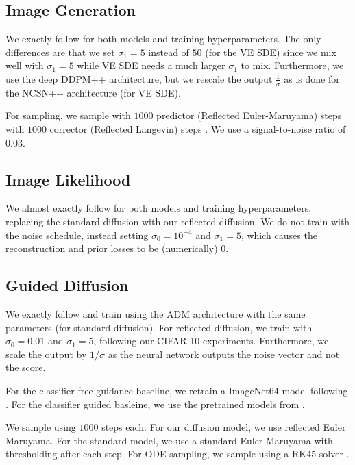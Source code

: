 \documentclass{article}
\theoremstyle{plain}
\theoremstyle{definition}
\theoremstyle{remark}
\begin{document}
\subsection{Image Generation}\label{sec:app:experiment:imgqual}

We exactly follow \citet{Song2020ScoreBasedGM} for both models and training hyperparameters. The only differences are that we set $\sigma_1 = 5$ instead of $50$ (for the VE SDE) since we mix well with $\sigma_1 = 5$ while VE SDE needs a much larger $\sigma_1$ to mix. Furthermore, we use the deep DDPM++ architecture, but we rescale the output $\frac{1}{\sigma}$ as is done for the NCSN++ architecture (for VE SDE).

For sampling, we sample with $1000$ predictor (Reflected Euler-Maruyama) steps with $1000$ corrector (Reflected Langevin) steps \citep{Song2020ScoreBasedGM}. We use a signal-to-noise ratio of $0.03$.

\subsection{Image Likelihood}\label{sec:app:experiment:imglike}

We almost exactly follow \citet{Kingma2021VariationalDM} for both models and training hyperparameters, replacing the standard diffusion with our reflected diffusion. We do not train with the noise schedule, instead setting $\sigma_0 = 10^{-4}$ and $\sigma_1 = 5$, which causes the reconstruction and prior losses to be (numerically) $0$.

\subsection{Guided Diffusion}\label{sec:app:experiment:guided}

We exactly follow \citet{Ho2022ClassifierFreeDG} and train using the ADM architecture \citep{Dhariwal2021DiffusionMB} with the same parameters (for standard diffusion). For reflected diffusion, we train with $\sigma_0 = 0.01$ and $\sigma_1 = 5$, following our CIFAR-10 experiments. Furthermore, we scale the output by $1/\sigma$ as the neural network outputs the noise vector and not the score.

For the classifier-free guidance baseline, we retrain a ImageNet64 model following \citet{Ho2022ClassifierFreeDG}. For the classifier guided basleine, we use the pretrained models from \citet{Dhariwal2021DiffusionMB}.

We sample using $1000$ steps each. For our diffusion model, we use reflected Euler Maruyama. For the standard model, we use a standard Euler-Maruyama with thresholding after each step. For ODE sampling, we sample using a RK45 solver \citep{Dormand1980AFO}.
\end{document}
